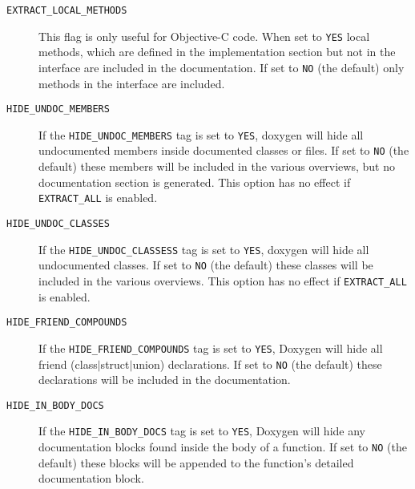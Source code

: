 \begin{description}
\label{config_cfg_extract_local_methods}
\hypertarget{config_cfg_extract_local_methods}{}
 \item[{\tt EXTRACT\_\-LOCAL\_\-METHODS} ] This flag is only useful for Objective-C code. When set to {\tt YES} local methods, which are defined in the implementation section but not in the interface are included in the documentation. If set to {\tt NO} (the default) only methods in the interface are included.

\label{config_cfg_hide_undoc_members}
\hypertarget{config_cfg_hide_undoc_members}{}
 \item[{\tt HIDE\_\-UNDOC\_\-MEMBERS} ] If the {\tt HIDE\_\-UNDOC\_\-MEMBERS} tag is set to {\tt YES}, doxygen will hide all undocumented members inside documented classes or files. If set to {\tt NO} (the default) these members will be included in the various overviews, but no documentation section is generated. This option has no effect if {\tt EXTRACT\_\-ALL} is enabled.

\label{config_cfg_hide_undoc_classes}
\hypertarget{config_cfg_hide_undoc_classes}{}
 \item[{\tt HIDE\_\-UNDOC\_\-CLASSES} ] If the {\tt HIDE\_\-UNDOC\_\-CLASSESS} tag is set to {\tt YES}, doxygen will hide all undocumented classes. If set to {\tt NO} (the default) these classes will be included in the various overviews. This option has no effect if {\tt EXTRACT\_\-ALL} is enabled.

\label{config_cfg_hide_friend_compounds}
\hypertarget{config_cfg_hide_friend_compounds}{}
 \item[{\tt HIDE\_\-FRIEND\_\-COMPOUNDS} ] If the {\tt HIDE\_\-FRIEND\_\-COMPOUNDS} tag is set to {\tt YES}, Doxygen will hide all friend (class$|$struct$|$union) declarations. If set to {\tt NO} (the default) these declarations will be included in the documentation.

\label{config_cfg_hide_in_body_docs}
\hypertarget{config_cfg_hide_in_body_docs}{}
 \item[{\tt HIDE\_\-IN\_\-BODY\_\-DOCS} ] If the {\tt HIDE\_\-IN\_\-BODY\_\-DOCS} tag is set to {\tt YES}, Doxygen will hide any documentation blocks found inside the body of a function. If set to {\tt NO} (the default) these blocks will be appended to the function's detailed documentation block.


\end{description}
